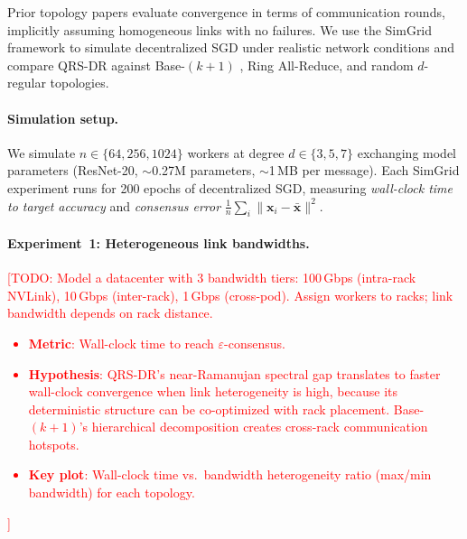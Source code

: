 \documentclass{article}
\newcommand{\bx}{\mathbf{x}}
\begin{document}
Prior topology papers evaluate convergence in terms of communication
rounds, implicitly assuming homogeneous links with no failures.  We use
the SimGrid framework \cite{simgrid2014} to simulate decentralized SGD
under realistic network conditions and compare QRS-DR against
Base-$(k{+}1)$ \cite{takezawa2023base}, Ring All-Reduce, and random
$d$-regular topologies.

\paragraph{Simulation setup.}
We simulate $n \in \{64, 256, 1024\}$ workers at degree $d \in \{3, 5, 7\}$
exchanging model parameters (ResNet-20, $\sim$0.27M parameters, $\sim$1\,MB
per message).  Each SimGrid experiment runs for 200 epochs of
decentralized SGD, measuring \emph{wall-clock time to target accuracy}
and \emph{consensus error} $\frac{1}{n}\sum_i\|\bx_i - \bar{\bx}\|^2$.

\paragraph{Experiment~1: Heterogeneous link bandwidths.}
\textcolor{red}{[TODO: Model a datacenter with 3 bandwidth tiers: 100\,Gbps
(intra-rack NVLink), 10\,Gbps (inter-rack), 1\,Gbps (cross-pod).
Assign workers to racks; link bandwidth depends on rack distance.
\begin{itemize}
\item \textbf{Metric}: Wall-clock time to reach $\varepsilon$-consensus.
\item \textbf{Hypothesis}: QRS-DR's near-Ramanujan spectral gap translates
    to faster wall-clock convergence when link heterogeneity is high,
    because its deterministic structure can be co-optimized with rack
    placement.  Base-$(k{+}1)$'s hierarchical decomposition creates
    cross-rack communication hotspots.
\item \textbf{Key plot}: Wall-clock time vs.\ bandwidth heterogeneity
    ratio (max/min bandwidth) for each topology.
\end{itemize}]}
\end{document}
